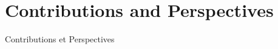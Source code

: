 




\newpage


\section{Contributions and Perspectives}{Contributions et Perspectives}

\label{sec:contributions}










